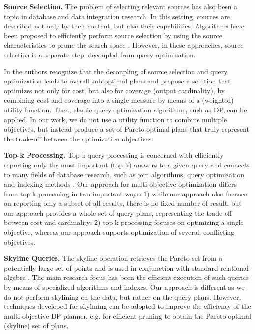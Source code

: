 \textbf{Source Selection.} The problem of selecting relevant sources
has also been a topic in database and data integration research. In
this setting, sources are described not only by their content, but
also their capabilities. Algorithms have been proposed to efficiently
perform source selection by using the source characteristics to prune
the search space \cite{levy_querying_1996}. However, in these
approaches, source selection is a separate step, decoupled from query
optimization.

In \cite{nie_joint_2001} the authors recognize that the decoupling of
source selection and query optimization leads to overall sub-optimal
plans and propose a solution that optimizes not only for cost, but
also for coverage (output cardinality), by combining cost and coverage
into a single measure by means of a (weighted) utility function. Then,
classic query optimization algorithms, such as DP, can be applied. In
our work, we do not use a utility function to combine multiple
objectives, but instead produce a set of Pareto-optimal plans that
truly represent the trade-off between the optimization objectives.

\textbf{Top-k Processing.} Top-k query processing is concerned with
efficiently reporting only the most important (top-k) answers to a
given query and connects to many fields of database research, such as
join algorithms, query optimization and indexing methods
\cite{ilyas_survey_2008}. Our approach for multi-objective
optimization differs from top-k processing in two important ways: 1)
while our approach also focuses on reporting only a subset of all
results, there is no fixed number of result, but our approach provides
a whole set of query plans, representing the trade-off between cost
and cardinality; 2) top-k processing focuses on optimizing a single
objective, whereas our approach supports optimization of several,
conflicting objectives.

\textbf{Skyline Queries.} The skyline operation retrieves the Pareto
set from a potentially large set of points and is used in conjunction
with standard relational algebra \cite{boerzsoenyi_skyline_2001}. The
main research focus has been the efficient execution of such queries
by means of specialized algorithms and indexes. Our approach is
different as we do not perform skylining on the data, but rather on
the query plans. However, techniques developed for skylining can be
adopted to improve the efficiency of the multi-objective DP planner,
e.g. for efficient pruning to obtain the Pareto-optimal (skyline) set
of plans.


